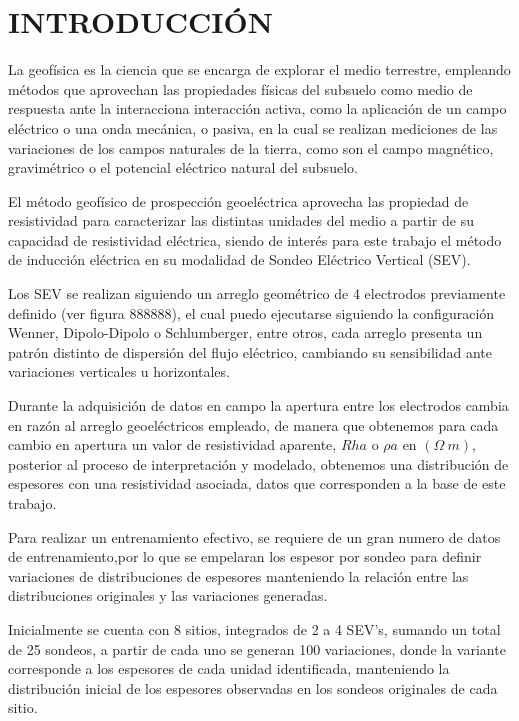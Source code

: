 \chapter{INTRODUCCIÓN}
La geofísica es la ciencia que se encarga de explorar el medio terrestre, empleando métodos que aprovechan las propiedades físicas del subsuelo como medio de respuesta ante la interacciona interacción activa, como la aplicación de un campo eléctrico o una onda mecánica,  o pasiva, en la cual se realizan mediciones de las variaciones de los campos naturales de la tierra, como son el campo magnético, gravimétrico o el potencial eléctrico natural del subsuelo.

El método geofísico de prospección geoeléctrica aprovecha las propiedad de resistividad para caracterizar las distintas unidades del medio a partir de su capacidad de resistividad eléctrica, siendo de interés para este trabajo el método de inducción eléctrica en su modalidad de Sondeo Eléctrico Vertical (SEV).

Los SEV se realizan siguiendo un arreglo geométrico de 4 electrodos previamente definido (ver figura 888888), el cual puedo ejecutarse siguiendo la configuración Wenner, Dipolo-Dipolo o Schlumberger, entre otros, cada arreglo presenta un patrón distinto de dispersión del flujo eléctrico, cambiando su sensibilidad ante variaciones verticales u horizontales. 

Durante la adquisición de datos en campo la apertura entre los electrodos cambia en razón al arreglo geoeléctricos empleado, de manera que obtenemos para cada cambio en apertura un valor de resistividad aparente, $Rha$ o $\rho a$ en $(\varOmega\ m)$, posterior al proceso de interpretación y modelado, obtenemos una distribución de espesores con una resistividad asociada, datos que corresponden a la base de este trabajo.

Para realizar un entrenamiento efectivo, se requiere de un gran numero de datos de entrenamiento,por lo que se empelaran los espesor por sondeo para definir variaciones de distribuciones de espesores manteniendo la relación entre las distribuciones originales y las variaciones generadas.

Inicialmente se cuenta con 8 sitios, integrados de 2 a 4 SEV's, sumando un total de 25 sondeos, a partir de cada uno se generan 100 variaciones, donde la variante corresponde a los espesores de cada unidad identificada, manteniendo la distribución inicial de los espesores observadas en los sondeos originales de cada sitio.

